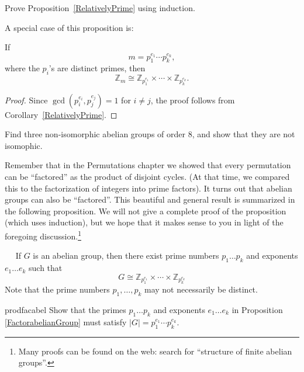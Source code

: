 \begin{exercise}{}
Prove Proposition~\ref{RelativelyPrime} using induction.
\end{exercise}

A special case of this proposition is:
 
\begin{corollary}
If
\[
m = p_1^{e_1} \cdots  p_k^{e_k},
\]
where the $p_i$'s are distinct primes, then
\[
{\mathbb Z}_m \cong {\mathbb Z}_{p_1^{e_1}} \times \cdots \times {\mathbb
Z}_{p_k^{e_k}}.
\]
\end{corollary}
 
 
\begin{proof}
Since  $\gcd(p_i^{e_i},p_j^{e_j}) = 1$ for $i \neq j$, the proof follows from Corollary~\ref{RelativelyPrime}.
\end{proof}

\begin{exercise}{}
Find three non-isomorphic abelian groups of order 8, and show that they are not isomophic.
\end{exercise}


Remember that in the Permutations chapter we showed that every permutation can be ``factored''  as the product of disjoint cycles. (At that time, we compared this to the factorization of integers into prime factors).  It turns out that abelian groups can also be ``factored''.  This beautiful and general result is summarized in the following proposition. We will not give a complete proof of the proposition (which uses induction), but we hope that it makes sense to you in light of the foregoing discussion.\footnote{Many proofs can be found on the web: search for ``structure of finite abelian groups''.}

\begin{thm}\label{FactorabelianGroup} ~~
If $G$ is an abelian group, then there exist prime numbers $p_1 \ldots p_k$ and exponents $e_1 \ldots e_k$ such that
\[
G \cong {\mathbb Z}_{p_1^{e_1}} \times \cdots \times {\mathbb
Z}_{p_k^{e_k}}
\]
Note that the prime numbers $p_1, \ldots, p_k$  may not necessarily be distinct.
\end{thm}

\begin{exercise}{prodfacabel}
Show that the primes  $p_1 \ldots p_k$ and exponents $e_1 \ldots e_k$ in Proposition~ \ref{FactorabelianGroup} must satisfy
$|G| = p_1^{e_1} \cdots p_k^{e_k}$.
\end{exercise}

